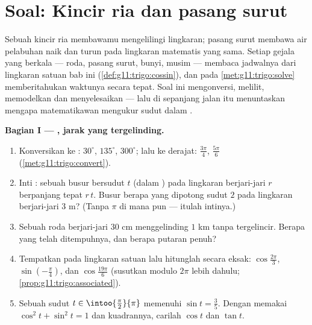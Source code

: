 \section{Soal: Kincir ria dan pasang surut}

\begin{problem}
\label{pb:g11:trigo:1}
Sebuah kincir ria membawamu mengelilingi lingkaran; pasang surut membawa
air pelabuhan naik dan turun pada lingkaran matematis yang sama. Setiap
gejala yang berkala --- roda, pasang surut, bunyi, musim --- membaca
jadwalnya dari lingkaran satuan bab ini
(\cref{def:g11:trigo:cossin}), dan  pada
\cref{met:g11:trigo:solve} memberitahukan waktunya secara tepat. Soal ini
mengonversi, melilit, memodelkan dan menyelesaikan --- lalu di sepanjang
jalan itu menuntaskan mengapa matematikawan mengukur sudut dalam .

\medskip
\noindent\textbf{Bagian I --- , jarak yang tergelinding.}
\begin{enumerate}
  \item Konversikan ke : $30^\circ$, $135^\circ$,
        $300^\circ$; lalu ke derajat: $\frac{3\pi}{4}$,
        $\frac{5\pi}{6}$ (\cref{met:g11:trigo:convert}).
  \item Inti : sebuah busur bersudut $t$ (dalam
        ) pada lingkaran berjari-jari $r$ berpanjang tepat
        $r\,t$. Busur berapa yang dipotong sudut $2$  pada
        lingkaran berjari-jari $3$ m? (Tanpa $\pi$ di mana pun --- itulah
        intinya.)
  \item Sebuah roda berjari-jari $30$ cm menggelinding $1$ km tanpa
        tergelincir. Berapa \emph{} yang telah ditempuhnya,
        dan berapa putaran penuh?
  \item Tempatkan pada lingkaran satuan lalu hitunglah secara eksak:
        $\cos\frac{2\pi}{3}$, $\sin\left(-\frac{\pi}{4}\right)$,
        dan $\cos\frac{19\pi}{6}$ (susutkan modulo $2\pi$ lebih dahulu;
        \cref{prop:g11:trigo:associated}).
  \item Sebuah sudut $t \in \intoo{\frac\pi2}{\pi}$ memenuhi
        $\sin t = \frac35$. Dengan memakai
        $\cos^2 t + \sin^2 t = 1$ dan kuadrannya, carilah
        $\cos t$ dan $\tan t$.
\end{enumerate}


\end{problem}
